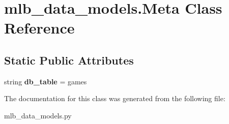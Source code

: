 \hypertarget{classmlb__data__models_1_1Meta}{}\section{mlb\+\_\+data\+\_\+models.\+Meta Class Reference}
\label{classmlb__data__models_1_1Meta}
\subsection*{Static Public Attributes}
\begin{DoxyCompactItemize}
\item 
string {\bfseries db\+\_\+table} = \textquotesingle{}games\textquotesingle{}\hypertarget{classmlb__data__models_1_1Meta_a035487a4d3678202844f9abe569780e3}{}\label{classmlb__data__models_1_1Meta_a035487a4d3678202844f9abe569780e3}

\end{DoxyCompactItemize}


The documentation for this class was generated from the following file\+:\begin{DoxyCompactItemize}
\item 
mlb\+\_\+data\+\_\+models.\+py\end{DoxyCompactItemize}
